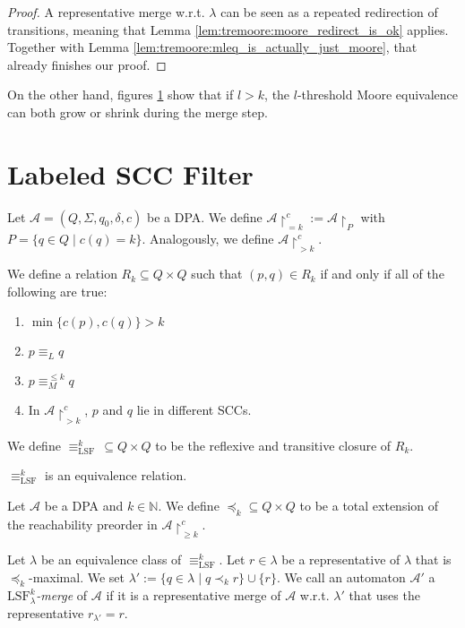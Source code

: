 \begin{proof}
	A representative merge w.r.t. $\lambda$ can be seen as a repeated redirection of transitions, meaning that Lemma \ref{lem:tremoore:moore_redirect_is_ok} applies. Together with Lemma \ref{lem:tremoore:mleq_is_actually_just_moore}, that already finishes our proof.
\end{proof}

On the other hand, figures \ref{} show that if $l > k$, the $l$-threshold Moore equivalence can both grow or shrink during the merge step. %















\section{Labeled SCC Filter}
\begin{defn}
	Let $\mathcal{A} = (Q, \Sigma, q_0, \delta, c)$ be a DPA. We define $\mathcal{A}\upharpoonright^c_{= k} := \mathcal{A}\upharpoonright_P$ with $P = \{q \in Q \mid c(q) = k\}$. Analogously, we define $\mathcal{A}\upharpoonright^c_{> k}$.
	
	We define a relation $R_k \subseteq Q \times Q$ such that $(p, q) \in R_k$ if and only if all of the following are true:
	\begin{enumerate}
		\item $\min \{c(p), c(q)\} > k$
		\item $p \equiv_L q$
		\item $p \equiv_M^{\leq k} q$
		\item In $\mathcal{A}\upharpoonright^c_{> k}$, $p$ and $q$ lie in different SCCs.
	\end{enumerate}
	
	We define $\equiv_\text{LSF}^k \,\subseteq Q \times Q$ to be the reflexive and transitive closure of $R_k$.
\end{defn}

\begin{lem}
	$\equiv_\text{LSF}^k$ is an equivalence relation.
\end{lem}

\begin{defn}
	Let $\mathcal{A}$ be a DPA and $k \in \mathbb{N}$. We define $\preceq_k \subseteq Q \times Q$ to be a total extension of the reachability preorder in $\mathcal{A}\upharpoonright^c_{\geq k}$.
	
	Let $\lambda$ be an equivalence class of $\equiv_\text{LSF}^k$. Let $r \in \lambda$ be a representative of $\lambda$ that is $\preceq_k$-maximal. We set $\lambda' := \{q \in \lambda \mid q \prec_k r\} \cup \{r\}$. We call an automaton $\mathcal{A}'$ a \emph{$\text{LSF}_\lambda^k$-merge} of $\mathcal{A}$ if it is a representative merge of $\mathcal{A}$ w.r.t. $\lambda'$ that uses the representative $r_{\lambda'} = r$.
\end{defn}

